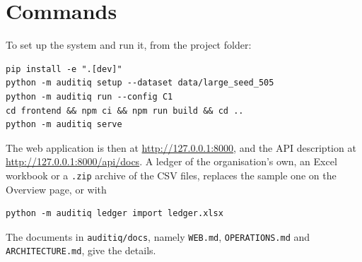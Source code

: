 \documentclass[11pt,a4paper]{article}
\begin{document}
\section{Commands}
To set up the system and run it, from the project folder:
\begin{verbatim}
pip install -e ".[dev]"
python -m auditiq setup --dataset data/large_seed_505
python -m auditiq run --config C1
cd frontend && npm ci && npm run build && cd ..
python -m auditiq serve
\end{verbatim}
The web application is then at \url{http://127.0.0.1:8000}, and the API description at \url{http://127.0.0.1:8000/api/docs}. A ledger of the organisation's own, an Excel workbook or a \texttt{.zip} archive of the CSV files, replaces the sample one on the Overview page, or with
\begin{verbatim}
python -m auditiq ledger import ledger.xlsx
\end{verbatim}
The documents in \texttt{auditiq/docs}, namely \texttt{WEB.md}, \texttt{OPERATIONS.md} and \texttt{ARCHITECTURE.md}, give the details.

\end{document}

